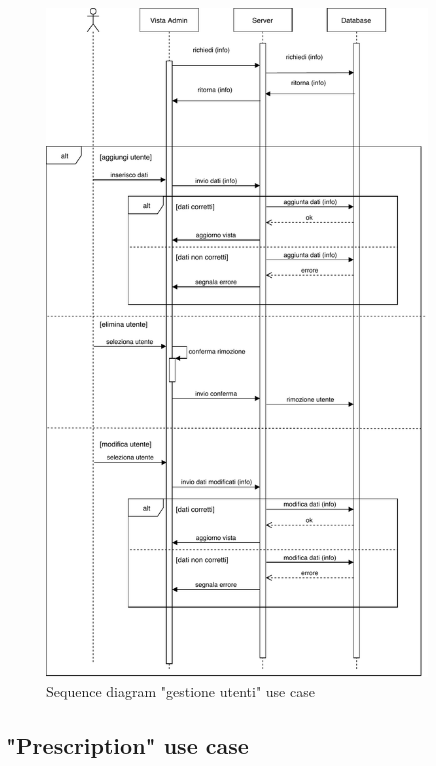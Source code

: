 \documentclass{article}
\begin{document}
\begin{figure}[H]

		\includegraphics[width=0.9\textwidth]{documenti/sequence_diagram_getioneUtenti.pdf}
		\caption{Sequence diagram "gestione utenti" use case}
		\label{Activity_diagram_getioneUtenti}

	\end{figure}



\vspace{2cm}


\subsection{"Prescription" use case}
\end{document}
